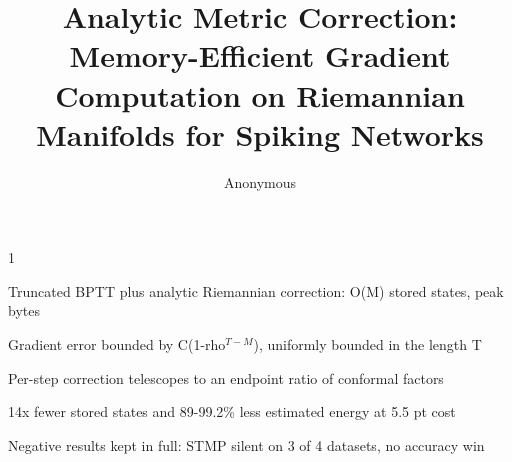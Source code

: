 \documentclass[a4paper,fleqn]{cas-dc}
\begin{document}
\newcommand{\paperVersion}{v53}


\title[mode=title]{Analytic Metric Correction: Memory-Efficient Gradient Computation on Riemannian Manifolds for Spiking Networks}

\author[1]{Anonymous}%
\cormark[1]
 {1}




\begin{highlights}
\item Truncated BPTT plus analytic Riemannian correction: O(M) stored states, peak bytes
\item Gradient error bounded by C(1-rho$^{T-M}$), uniformly bounded in the length T
\item Per-step correction telescopes to an endpoint ratio of conformal factors
\item 14x fewer stored states and 89-99.2\% less estimated energy at 5.5 pt cost
\item Negative results kept in full: STMP silent on 3 of 4 datasets, no accuracy win
\end{highlights}
\end{document}
